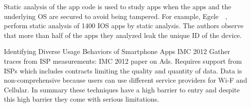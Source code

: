 Static analysis of the app code is used to study apps when the apps and the
underlying OS are secured to avoid being tampered. For example,
Egele~\etal~\cite{egele:pios}, perform static analysis of 1400 IOS apps by
static analysis. The authors observe that more than half of the apps they
analyzed leak the unique ID of the device. 




{Identifying Diverse Usage Behaviors of Smartphone Apps} {IMC 2012} 
        Gather traces from ISP measurements: IMC 2012 paper on Ads.
Requires
support from ISPs which includes contracts limiting the quality and
quantity of
data. Data is non-comprehensive because users can use different service
providers for Wi-F and Cellular.
    In summary these techniques have a high barrier to entry and despite
this
high barrier they come with serious limitations. 






